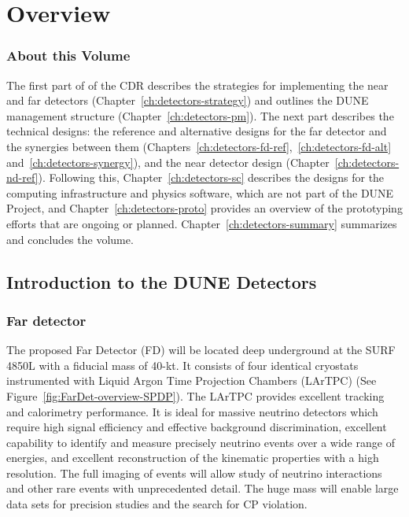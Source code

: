 \chapter{Overview}
\label{ch:detectors-overview}




\subsection{About this Volume}

The first part of \voldune of the CDR describes the strategies for
implementing the near and far detectors
(Chapter~\ref{ch:detectors-strategy}) and outlines the DUNE management
structure (Chapter~\ref{ch:detectors-pm}). The next part describes the
technical designs: the reference and alternative designs for the far
detector and the synergies between them
(Chapters~\ref{ch:detectors-fd-ref},~\ref{ch:detectors-fd-alt}
and~\ref{ch:detectors-synergy}), and the near detector design
(Chapter~\ref{ch:detectors-nd-ref}).  Following this,
Chapter~\ref{ch:detectors-sc} describes the designs for the computing
infrastructure and physics software, which are not part of the DUNE Project, and
Chapter~\ref{ch:detectors-proto} provides an overview of the
prototyping efforts that are ongoing or
planned. Chapter~\ref{ch:detectors-summary} summarizes and concludes
the volume.
 
\section{Introduction to the DUNE Detectors}
\label{sec:intro-dune-det}

\subsection{Far detector}
\label{sec:intro-dune-far-det}

The proposed Far Detector (FD) will be located deep underground at the
SURF 4850L with a fiducial mass of 40-kt. It consists of four
identical cryostats instrumented with Liquid Argon Time Projection
Chambers (LArTPC) (See Figure~\ref{fig:FarDet-overview-SPDP}). The
LArTPC provides excellent tracking and calorimetry performance. It is
ideal for massive neutrino detectors which require high signal
efficiency and effective background discrimination, excellent
capability to identify and measure precisely neutrino events over a
wide range of energies, and excellent reconstruction of the kinematic
properties with a high resolution. The full imaging of events will
allow study of neutrino interactions and other rare events with
unprecedented detail. The huge mass will enable large data sets for
precision studies and the search for CP violation.

